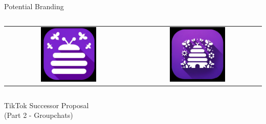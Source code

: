 \documentclass[aspectratio=169]{beamer}
\begin{document}
\begin{frame}{Potential Branding}
\begin{columns}[T]
\begin{column}{0.5\textwidth}
\begin{tabular}{cc}
            \includegraphics[width=0.45\textwidth]{imgs/app_icons/1.png} & \includegraphics[width=0.45\textwidth]{imgs/app_icons/2.png} \\ 
        \end{tabular}
    \end{column}
\end{columns}
\end{frame}

\begin{frame}
    \centering
    \Huge TikTok Successor Proposal \\
    \Huge (Part 2 - Groupchats)
\end{frame}
\end{document}
